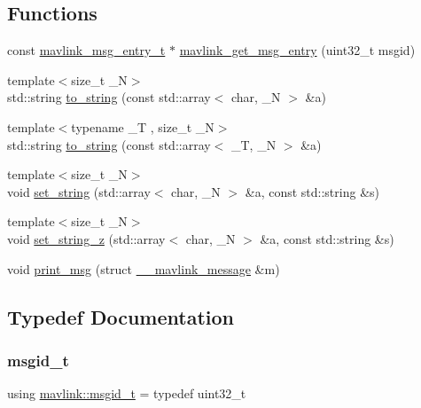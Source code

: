 \subsection*{Functions}
\begin{DoxyCompactItemize}
\item 
const \mbox{\hyperlink{include__v2_80_2mavlink__types_8h_abf009bf897407a543e5209298ad82321}{mavlink\+\_\+msg\+\_\+entry\+\_\+t}} $\ast$ \mbox{\hyperlink{group__mavconn_ga5729c8752b868b9b15dc7154a66c4a14}{mavlink\+\_\+get\+\_\+msg\+\_\+entry}} (uint32\+\_\+t msgid)
\item 
{\footnotesize template$<$size\+\_\+t \+\_\+N$>$ }\\std\+::string \mbox{\hyperlink{namespacemavlink_a3a4897758bbfeb0c28182fef6f3bc60f}{to\+\_\+string}} (const std\+::array$<$ char, \+\_\+N $>$ \&a)
\item 
{\footnotesize template$<$typename \+\_\+T , size\+\_\+t \+\_\+N$>$ }\\std\+::string \mbox{\hyperlink{namespacemavlink_a9bf01b56d8e27c1ef4df5f0333aafedc}{to\+\_\+string}} (const std\+::array$<$ \+\_\+T, \+\_\+N $>$ \&a)
\item 
{\footnotesize template$<$size\+\_\+t \+\_\+N$>$ }\\void \mbox{\hyperlink{namespacemavlink_a5840b5d0456297c5e6fe78b3f539baea}{set\+\_\+string}} (std\+::array$<$ char, \+\_\+N $>$ \&a, const std\+::string \&s)
\item 
{\footnotesize template$<$size\+\_\+t \+\_\+N$>$ }\\void \mbox{\hyperlink{namespacemavlink_a8013d2f78a8d12109e9eb918a54b1cb5}{set\+\_\+string\+\_\+z}} (std\+::array$<$ char, \+\_\+N $>$ \&a, const std\+::string \&s)
\item 
void \mbox{\hyperlink{namespacemavlink_a34c4d0af4523b33924f243cc4a63d156}{print\+\_\+msg}} (struct \mbox{\hyperlink{struct____mavlink__message}{\+\_\+\+\_\+mavlink\+\_\+message}} \&m)
\end{DoxyCompactItemize}


\subsection{Typedef Documentation}
\mbox{\label{namespacemavlink_a98a1fe49b380ed1ea252d2c13bf3278d}} 
\subsubsection{\texorpdfstring{msgid\_t}{msgid\_t}}
{\footnotesize\ttfamily using \mbox{\hyperlink{namespacemavlink_a98a1fe49b380ed1ea252d2c13bf3278d}{mavlink\+::msgid\+\_\+t}} = typedef uint32\+\_\+t}



